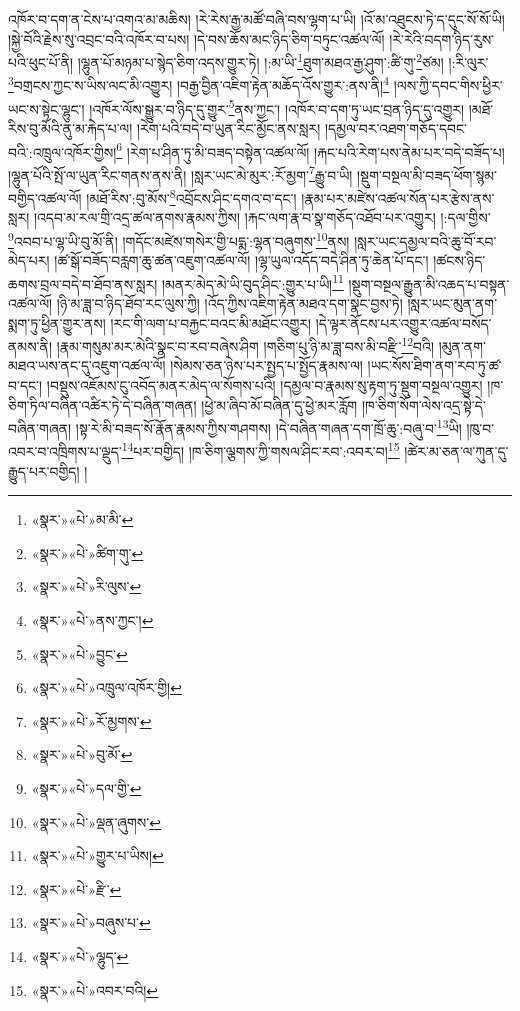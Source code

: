 འཁོར་བ་དག་ན་ངེས་པ་འགའ་མ་མཆིས། །རེ་རེས་རྒྱ་མཚོ་བཞི་བས་ལྷག་པ་ཡི། །འོ་མ་འཐུངས་ཏེ་ད་དུང་སོ་སོ་ཡི། །སྐྱེ་བོའི་རྗེས་སུ་འབྲང་བའི་འཁོར་བ་པས། །དེ་བས་ཆོས་མང་ཉིད་ཅིག་བཏུང་འཚལ་ལོ། །རེ་རེའི་བདག་ཉིད་རུས་པའི་ཕུང་པོ་ནི། །ལྷུན་པོ་མཉམ་པ་སྙེད་ཅིག་འདས་གྱུར་ཏེ། །:མ་ཡི་\footnote{«སྣར་»«པེ་»མ་མི་}ཐུག་མཐའ་རྒྱ་ཤུག་:ཚི་གུ་\footnote{«སྣར་»«པེ་»ཚིག་གུ་}ཙམ། །:རི་ལུར་\footnote{«སྣར་»«པེ་»རི་ལུས་}བགྲངས་ཀྱང་ས་ཡིས་ལང་མི་འགྱུར། །བརྒྱ་བྱིན་འཇིག་རྟེན་མཆོད་འོས་གྱུར་:ནས་ནི།\footnote{«སྣར་»«པེ་»ནས་ཀྱང་།} །ལས་ཀྱི་དབང་གིས་ཕྱིར་ཡང་ས་སྟེང་ལྷུང་། །འཁོར་ལོས་སྒྱུར་བ་ཉིད་དུ་གྱུར་\footnote{«སྣར་»«པེ་»བྱུང་}ནས་ཀྱང་། །འཁོར་བ་དག་ཏུ་ཡང་བྲན་ཉིད་དུ་འགྱུར། །མཐོ་རིས་བུ་མོའི་ནུ་མ་རྐེད་པ་ལ། །རེག་པའི་བདེ་བ་ཡུན་རིང་མྱོང་ནས་སླར། །དམྱལ་བར་འཐག་གཅོད་དབང་བའི་:འཁྲུལ་འཁོར་གྱིས།\footnote{«སྣར་»«པེ་»འཁྲུལ་འཁོར་གྱི།} །རེག་པ་ཤིན་ཏུ་མི་བཟད་བསྟེན་འཚལ་ལོ། །རྐང་པའི་རེག་པས་ནེམ་པར་བདེ་བཟོད་པ། །ལྷུན་པོའི་སྤོ་ལ་ཡུན་རིང་གནས་ནས་ནི། །སླར་ཡང་མེ་མུར་:རོ་མྱག་\footnote{«སྣར་»«པེ་»རོ་མྱགས་}རྒྱུ་བ་ཡི། །སྡུག་བསྔལ་མི་བཟད་ཕོག་སྙམ་བགྱིད་འཚལ་ལོ། །མཐོ་རིས་:བུ་མོས་\footnote{«སྣར་»«པེ་»བུ་མོ་}འབྲོངས་ཤིང་དགའ་བ་དང་། །རྣམ་པར་མཛེས་འཚལ་སོན་པར་རྩེས་ནས་སླར། །འདབ་མ་རལ་གྲི་འདྲ་ཚལ་ནགས་རྣམས་ཀྱིས། །རྐང་ལག་རྣ་བ་སྣ་གཅོད་འཐོབ་པར་འགྱུར། །:དལ་གྱིས་\footnote{«སྣར་»«པེ་»དལ་གྱི་}འབབ་པ་ལྷ་ཡི་བུ་མོ་ནི། །གདོང་མཛེས་གསེར་གྱི་པདྨ་:ལྷན་བཞུགས་\footnote{«སྣར་»«པེ་»ལྡན་ཞུགས་}ནས། །སླར་ཡང་དམྱལ་བའི་ཆུ་བོ་རབ་མེད་པར། །ཚ་སྒོ་བཟོད་བརླག་ཆུ་ཚན་འཇུག་འཚལ་ལོ། །ལྷ་ཡུལ་འདོད་བདེ་ཤིན་ཏུ་ཆེན་པོ་དང་། །ཚངས་ཉིད་ཆགས་བྲལ་བདེ་བ་ཐོབ་ནས་སླར། །མནར་མེད་མེ་ཡི་བུད་ཤིང་:གྱུར་པ་ཡི།\footnote{«སྣར་»«པེ་»གྱུར་པ་ཡིས།} །སྡུག་བསྔལ་རྒྱུན་མི་འཆད་པ་བསྟན་འཚལ་ལོ། །ཉི་མ་ཟླ་བ་ཉིད་ཐོབ་རང་ལུས་ཀྱི། །འོད་ཀྱིས་འཇིག་རྟེན་མཐའ་དག་སྣང་བྱས་ཏེ། །སླར་ཡང་མུན་ནག་སྨག་ཏུ་ཕྱིན་གྱུར་ནས། །རང་གི་ལག་པ་བརྐྱང་བའང་མི་མཐོང་འགྱུར། །དེ་ལྟར་ནོངས་པར་འགྱུར་འཚལ་བསོད་ནམས་ནི། །རྣམ་གསུམ་མར་མེའི་སྣང་བ་རབ་བཞེས་ཤིག །གཅིག་པུ་ཉི་མ་ཟླ་བས་མི་བརྫི་\footnote{«སྣར་»«པེ་»རྫི་}བའི། །མུན་ནག་མཐའ་ཡས་ནང་དུ་འཇུག་འཚལ་ལོ། །སེམས་ཅན་ཉེས་པར་སྤྱད་པ་སྤྱོད་རྣམས་ལ། །ཡང་སོས་ཐིག་ནག་རབ་ཏུ་ཚ་བ་དང་། །བསྡུས་འཇོམས་ངུ་འབོད་མནར་མེད་ལ་སོགས་པའི། །དམྱལ་བ་རྣམས་སུ་རྟག་ཏུ་སྡུག་བསྔལ་འགྱུར། །ཁ་ཅིག་ཏིལ་བཞིན་འཚིར་ཏེ་དེ་བཞིན་གཞན། །ཕྱེ་མ་ཞིབ་མོ་བཞིན་དུ་ཕྱེ་མར་རློག །ཁ་ཅིག་སོག་ལེས་འདྲ་སྟེ་དེ་བཞིན་གཞན། །སྟ་རེ་མི་བཟད་སོ་རྣོན་རྣམས་ཀྱིས་གཤགས། །དེ་བཞིན་གཞན་དག་ཁྲོ་ཆུ་:བཞུ་བ་\footnote{«སྣར་»«པེ་»བཞུས་པ་}ཡི། །ཁུ་བ་འབར་བ་འཁྲིགས་པ་ལྡུད་\footnote{«སྣར་»«པེ་»ལྷུད་}པར་བགྱིད། །ཁ་ཅིག་ལྕགས་ཀྱི་གསལ་ཤིང་རབ་:འབར་བ།\footnote{«སྣར་»«པེ་»འབར་བའི།} །ཚེར་མ་ཅན་ལ་ཀུན་དུ་རྒྱུད་པར་བགྱིད། །

